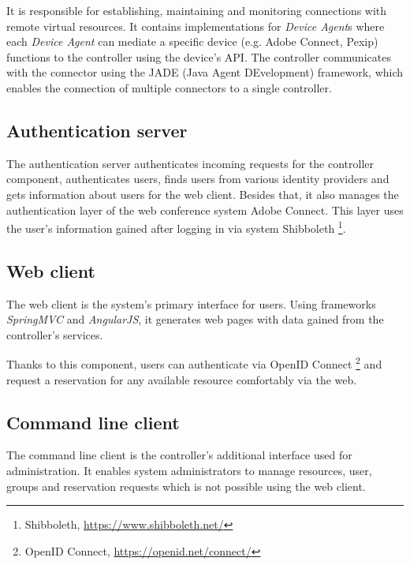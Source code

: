 It is responsible for establishing, maintaining and monitoring connections with remote virtual resources.
It contains implementations for \emph{Device Agent}s where each \emph{Device Agent} can mediate a specific device (e.g. Adobe Connect, Pexip) functions to the controller using the device's API.
The controller communicates with the connector using the JADE (Java Agent DEvelopment) framework, which enables the connection of multiple connectors to a single controller.

\subsection{Authentication server}
The authentication server authenticates incoming requests for the controller component, authenticates users, finds users from various identity providers and gets information about users for the web client.
Besides that, it also manages the authentication layer of the web conference system Adobe Connect. This layer uses the user's information gained after logging in via system Shibboleth \footnote{Shibboleth, \url{https://www.shibboleth.net/}}.

\subsection{Web client} \label{webclient}
The web client is the system's primary interface for users. Using frameworks \emph{SpringMVC} and \emph{AngularJS}, it generates web pages with data gained from the controller's services.

Thanks to this component, users can authenticate via OpenID Connect \footnote{OpenID Connect, \url{https://openid.net/connect/}} and request a reservation for any available resource comfortably via the web.

\subsection{Command line client}
The command line client is the controller's additional interface used for administration. It enables system administrators to manage resources, user, groups and reservation requests which is not possible using the web client.

